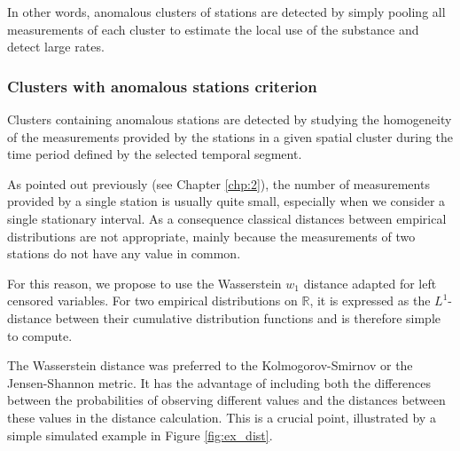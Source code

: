 In other words, anomalous clusters of stations are detected by simply pooling all measurements of each cluster to estimate the local use of the substance and detect large rates. 

\subsubsection{Clusters with anomalous stations criterion}

Clusters containing anomalous stations are detected by studying the homogeneity of the measurements provided by the stations in a given spatial cluster during the time period defined by the selected temporal segment.

As pointed out previously (see Chapter \ref{chp:2}), the number of measurements provided by a single station is usually quite small, especially when we consider a single stationary interval. As a consequence classical distances between empirical distributions are not appropriate, mainly because the measurements of two stations do not have any value in common. 

For this reason, we propose to use the Wasserstein $w_1$ distance \citep{villani2009optimal} adapted for left censored variables. For two empirical distributions on $\mathbb{R}$, it is expressed as the $L^1$-distance between their cumulative distribution functions and is therefore simple to compute. 

The Wasserstein distance was preferred to the Kolmogorov-Smirnov or the Jensen-Shannon metric. It has the advantage of including both the differences between the probabilities of observing different values and the distances between these values in the distance calculation. This is a crucial point, illustrated by a simple simulated example in Figure \ref{fig:ex_dist}.

